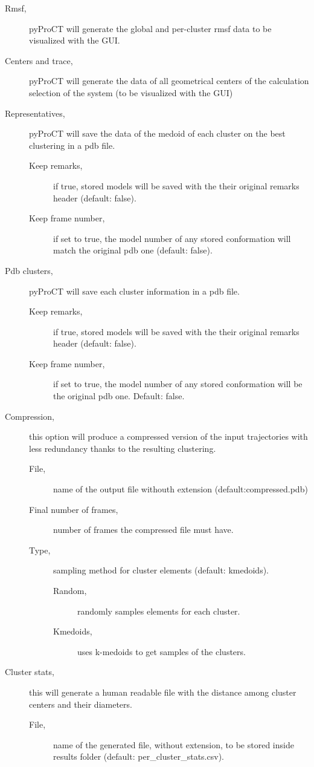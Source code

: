 \begin{description}
\item [Rmsf,] pyProCT will generate the global and per-cluster
rmsf data to be visualized with the GUI.
\item [Centers and trace,] pyProCT will generate the data of all geometrical centers of the calculation selection of the system (to be visualized with the GUI)
\item [Representatives,] pyProCT will save the data of the medoid of each cluster on the best clustering in a pdb file.
\begin{description}
\item [Keep remarks,] if true, stored models will be saved with the their original remarks header (default: false).
\item [Keep frame number,] if set to true, the model number of any stored conformation will match the original pdb one (default: false).
\end{description}
\item [Pdb clusters,] pyProCT will save each cluster information in a pdb file.
\begin{description}
\item [Keep remarks,] if true, stored models will be saved with the their original remarks header (default: false).
\item [Keep frame number,] if set to true, the model number of any stored conformation will be the original pdb one. Default: false.
\end{description}
\item [Compression,] this option will produce a compressed version of the input trajectories with less redundancy thanks to the resulting clustering.
\begin{description}
\item [File,] name of the output file withouth extension (default:compressed.pdb)
\item [Final number of frames,] number of frames the compressed file must have.
\item [Type,] sampling method for cluster elements (default: kmedoids).
\begin{description}
\item [Random,] randomly samples elements for each cluster.
\item [Kmedoids,] uses k-medoids to get samples of the clusters.
\end{description}
\end{description}
\item [Cluster stats,] this will generate a human readable file with the distance among cluster centers and their diameters.  
\begin{description}
\item [File,] name of the generated file, without extension, to be stored inside results folder (default: per\_cluster\_stats.csv).
\end{description}
\end{description}



